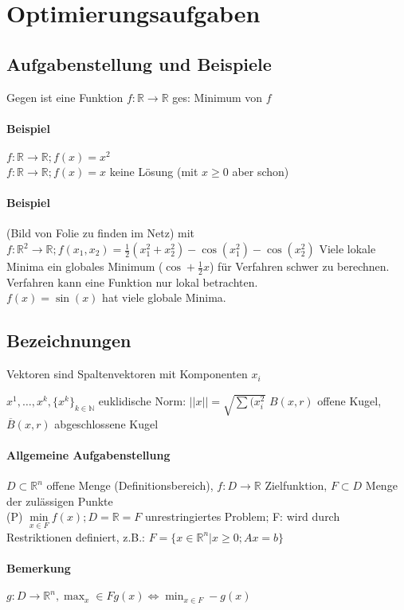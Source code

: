 \documentclass[ngerman,halfparskip]{scrartcl}
\theoremstyle{definition}
\newcommand*{\R}{\mathbb{R}}      %
\begin{document}
\section{Optimierungsaufgaben}
\subsection{Aufgabenstellung und Beispiele}
Gegen ist eine Funktion $f: \R \rightarrow \R$ ges: Minimum von $f$
\paragraph{Beispiel}
$f:\R\rightarrow \R; f(x)=x^2$\\
$f: \R\rightarrow \R; f(x)=x$ keine Lösung (mit $x\geq 0$ aber schon)
\paragraph{Beispiel}(Bild von Folie zu finden im Netz) mit  $f:\R^2\rightarrow\R; f(x_1,x_2)=\frac 12 (x_1^2+x_2^2)-\cos(x_1^2)-\cos(x_2^2)$ Viele lokale Minima ein globales Minimum ($\cos + \frac 1 2 x$) für Verfahren schwer zu berechnen. Verfahren kann eine Funktion nur lokal betrachten.\\
$f(x)=\sin(x)$ hat viele globale Minima.
\subsection*{Bezeichnungen}
Vektoren sind Spaltenvektoren mit Komponenten $x_i$

$x^1,\ldots,x^k, \{x^{k}\}_{k\in\mathbb{N}}$
euklidische Norm: $||x||=\sqrt{\sum(x_i^2}$
$B(x,r)$ offene Kugel, $\overline B(x,r)$ abgeschlossene Kugel\\

\paragraph*{Allgemeine Aufgabenstellung}
$D\subset\R^n$ offene Menge (Definitionsbereich), $f:D\rightarrow\R$ Zielfunktion, $F\subset D$ Menge der zulässigen Punkte\\
(P) $\min\limits_{x\in F} f(x); D=\R=F$ unrestringiertes Problem; F: wird durch Restriktionen definiert, z.B.: $F=\{x\in\R^n | x\geq 0; Ax=b\}$\\
\paragraph*{Bemerkung} $g: D\rightarrow\R^n, \max_x\in F g(x) \Leftrightarrow \min_{x\in F} -g(x)$
\end{document}
